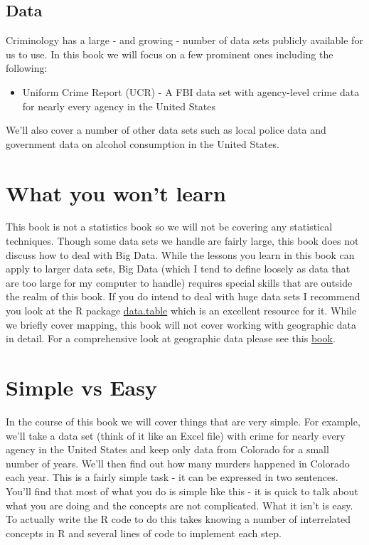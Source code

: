 \documentclass[
  12pt,
]{book}
\providecommand{\tightlist}{%
  \setlength{\itemsep}{0pt}\setlength{\parskip}{0pt}}
\begin{document}
\hypertarget{data}{%
\subsection*{Data}\label{data}}


Criminology has a large - and growing - number of data sets publicly available for us to use. In this book we will focus on a few prominent ones including the following:

\begin{itemize}
\tightlist
\item
  Uniform Crime Report (UCR) - A FBI data set with agency-level crime data for nearly every agency in the United States
\end{itemize}

We'll also cover a number of other data sets such as local police data and government data on alcohol consumption in the United States.

\hypertarget{what-you-wont-learn}{%
\section*{What you won't learn}\label{what-you-wont-learn}}


This book is not a statistics book so we will not be covering any statistical techniques. Though some data sets we handle are fairly large, this book does not discuss how to deal with Big Data. While the lessons you learn in this book can apply to larger data sets, Big Data (which I tend to define loosely as data that are too large for my computer to handle) requires special skills that are outside the realm of this book. If you do intend to deal with huge data sets I recommend you look at the R package \href{https://github.com/Rdatatable/data.table/wiki}{data.table} which is an excellent resource for it. While we briefly cover mapping, this book will not cover working with geographic data in detail. For a comprehensive look at geographic data please see this \href{https://geocompr.robinlovelace.net/}{book}.

\hypertarget{simple-vs-easy}{%
\section*{Simple vs Easy}\label{simple-vs-easy}}


In the course of this book we will cover things that are very simple. For example, we'll take a data set (think of it like an Excel file) with crime for nearly every agency in the United States and keep only data from Colorado for a small number of years. We'll then find out how many murders happened in Colorado each year. This is a fairly simple task - it can be expressed in two sentences. You'll find that most of what you do is simple like this - it is quick to talk about what you are doing and the concepts are not complicated. What it isn't is easy. To actually write the R code to do this takes knowing a number of interrelated concepts in R and several lines of code to implement each step.
\end{document}

